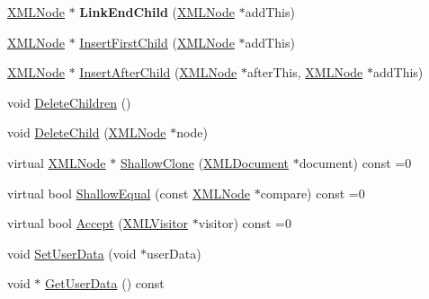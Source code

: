 \begin{DoxyCompactItemize}
\item 
\mbox{\label{classtinyxml2_1_1_x_m_l_node_a663e3a5a378169fd477378f4d17a7649}} 
\hyperlink{classtinyxml2_1_1_x_m_l_node}{X\+M\+L\+Node} $\ast$ {\bfseries Link\+End\+Child} (\hyperlink{classtinyxml2_1_1_x_m_l_node}{X\+M\+L\+Node} $\ast$add\+This)
\item 
\hyperlink{classtinyxml2_1_1_x_m_l_node}{X\+M\+L\+Node} $\ast$ \hyperlink{classtinyxml2_1_1_x_m_l_node_ac609a8f3ea949027f439280c640bbaf2}{Insert\+First\+Child} (\hyperlink{classtinyxml2_1_1_x_m_l_node}{X\+M\+L\+Node} $\ast$add\+This)
\item 
\hyperlink{classtinyxml2_1_1_x_m_l_node}{X\+M\+L\+Node} $\ast$ \hyperlink{classtinyxml2_1_1_x_m_l_node_a9275138a1b8dd5d8e2c26789bdc23ac8}{Insert\+After\+Child} (\hyperlink{classtinyxml2_1_1_x_m_l_node}{X\+M\+L\+Node} $\ast$after\+This, \hyperlink{classtinyxml2_1_1_x_m_l_node}{X\+M\+L\+Node} $\ast$add\+This)
\item 
void \hyperlink{classtinyxml2_1_1_x_m_l_node_a0360085cc54df5bff85d5c5da13afdce}{Delete\+Children} ()
\item 
void \hyperlink{classtinyxml2_1_1_x_m_l_node_a363b6edbd6ebd55f8387d2b89f2b0921}{Delete\+Child} (\hyperlink{classtinyxml2_1_1_x_m_l_node}{X\+M\+L\+Node} $\ast$node)
\item 
virtual \hyperlink{classtinyxml2_1_1_x_m_l_node}{X\+M\+L\+Node} $\ast$ \hyperlink{classtinyxml2_1_1_x_m_l_node_a8402cbd3129d20e9e6024bbcc0531283}{Shallow\+Clone} (\hyperlink{classtinyxml2_1_1_x_m_l_document}{X\+M\+L\+Document} $\ast$document) const =0
\item 
virtual bool \hyperlink{classtinyxml2_1_1_x_m_l_node_a7ce18b751c3ea09eac292dca264f9226}{Shallow\+Equal} (const \hyperlink{classtinyxml2_1_1_x_m_l_node}{X\+M\+L\+Node} $\ast$compare) const =0
\item 
virtual bool \hyperlink{classtinyxml2_1_1_x_m_l_node_a81e66df0a44c67a7af17f3b77a152785}{Accept} (\hyperlink{classtinyxml2_1_1_x_m_l_visitor}{X\+M\+L\+Visitor} $\ast$visitor) const =0
\item 
void \hyperlink{classtinyxml2_1_1_x_m_l_node_a002978fc889cc011d143185f2377eca2}{Set\+User\+Data} (void $\ast$user\+Data)
\item 
void $\ast$ \hyperlink{classtinyxml2_1_1_x_m_l_node_a7f0687574afa03bc479dc44f29db0afe}{Get\+User\+Data} () const
\end{DoxyCompactItemize}
